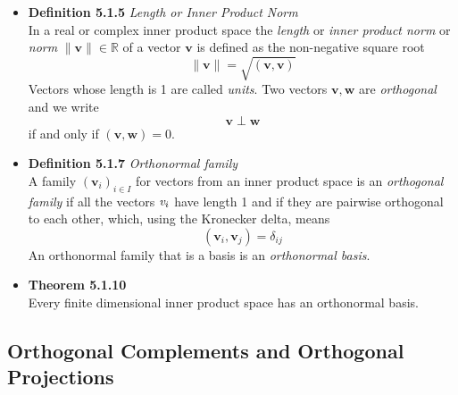 \documentclass[11pt,a4paper]{article}
\begin{document}
\begin{itemize}
    \item \textbf{Definition 5.1.5} \emph{Length or Inner Product Norm} \\
        In a real or complex inner product space the \emph{length} or \emph{inner product norm}
        or \emph{norm} $\lVert \mathbf{v} \rVert \in \mathbb{R}$ of a vector $\textbf{v}$
        is defined as the non-negative square root
        \[
            \lVert \mathbf{v} \rVert = \sqrt{(\mathbf{v}, \mathbf{v})}
        \]
        Vectors whose length is 1 are called \emph{units}.
        Two vectors $\mathbf{v}, \mathbf{w}$ are \emph{orthogonal} and we write
        \[
            \mathbf{v} \perp \mathbf{w}
        \]
        if and only if $(\mathbf{v}, \mathbf{w}) = 0$.

    \item \textbf{Definition 5.1.7} \emph{Orthonormal family} \\
        A family ${(\mathbf{v}_i)}_{i \in I}$ for vectors from an inner product space is an
        \emph{orthogonal family} if all the vectors $\emph{v}_i$ have length 1 and if they
        are pairwise orthogonal to each other, which, using the Kronecker delta, means
        \[
            (\mathbf{v}_i, \mathbf{v}_j) = \delta_{ij}
        \]
        An orthonormal family that is a basis is an \emph{orthonormal basis}.

    \item \textbf{Theorem 5.1.10} \\
        Every finite dimensional inner product space has an orthonormal basis.

\end{itemize}

\subsection{Orthogonal Complements and Orthogonal Projections}
\end{document}
